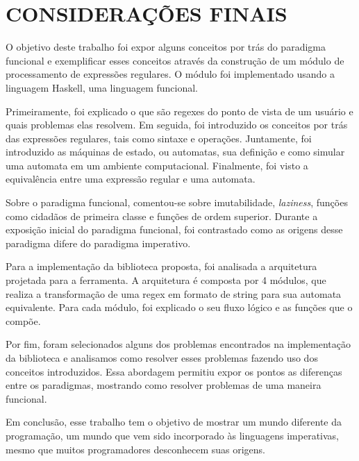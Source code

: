 \section{CONSIDERAÇÕES FINAIS}

O objetivo deste trabalho foi expor alguns conceitos por trás do paradigma funcional e exemplificar esses conceitos através da construção de um módulo de processamento de expressões regulares.
O módulo foi implementado usando a linguagem Haskell, uma linguagem funcional.

Primeiramente, foi explicado o que são regexes do ponto de vista de um usuário e quais problemas elas resolvem.
Em seguida, foi introduzido os conceitos por trás das expressões regulares, tais como sintaxe e operações.
Juntamente, foi introduzido as máquinas de estado, ou automatas, sua definição e como simular uma automata em um ambiente computacional.
Finalmente, foi visto a equivalência entre uma expressão regular e uma automata.

Sobre o paradigma funcional, comentou-se sobre imutabilidade, \emph{laziness}, funções como cidadãos de primeira classe e funções de ordem superior.
Durante a exposição inicial do paradigma funcional, foi contrastado como as origens desse paradigma difere do paradigma imperativo.

Para a implementação da biblioteca proposta, foi analisada a arquitetura projetada para a ferramenta.
A arquitetura é composta por 4 módulos, que realiza a transformação de uma regex em formato de string para sua automata equivalente.
Para cada módulo, foi explicado o seu fluxo lógico e as funções que o compõe.

Por fim, foram selecionados alguns dos problemas encontrados na implementação da biblioteca e analisamos como resolver esses problemas  fazendo uso dos conceitos introduzidos.
Essa abordagem permitiu expor os pontos as diferenças entre os paradigmas, mostrando como resolver problemas de uma maneira funcional.

Em conclusão, esse trabalho tem o objetivo de mostrar um mundo diferente da programação, um mundo que vem sido incorporado às linguagens imperativas, mesmo que muitos programadores desconhecem suas origens.

